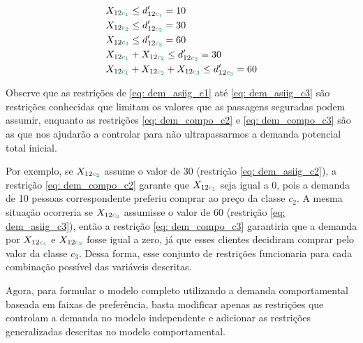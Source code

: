 \begin{align}
    & X_{12\textcolor[rgb]{0.0588, 0.5412, 0.4275}{c_1}} \leq d'_{12\textcolor[rgb]{0.0588, 0.5412, 0.4275}{c_1}} = 10                        \label{eq: dem_asiig_c1} \\
    & X_{12\textcolor[rgb]{0.0588, 0.5412, 0.4275}{c_2}} \leq d'_{12\textcolor[rgb]{0.0588, 0.5412, 0.4275}{c_2}} = 30                        \label{eq: dem_asiig_c2} \\
    & X_{12\textcolor[rgb]{0.0588, 0.5412, 0.4275}{c_3}} \leq d'_{12\textcolor[rgb]{0.0588, 0.5412, 0.4275}{c_3}} = 60                      \label{eq: dem_asiig_c3} \\
    & X_{12\textcolor[rgb]{0.0588, 0.5412, 0.4275}{c_1}} + X_{12\textcolor[rgb]{0.0588, 0.5412, 0.4275}{c_2}} \leq d'_{12\textcolor[rgb]{0.0588, 0.5412, 0.4275}{c_2}}  = 30           \label{eq: dem_compo_c2} \\
    & X_{12\textcolor[rgb]{0.0588, 0.5412, 0.4275}{c_1}} + X_{12\textcolor[rgb]{0.0588, 0.5412, 0.4275}{c_2}} + X_{12\textcolor[rgb]{0.0588, 0.5412, 0.4275}{c_3}} \leq d'_{12\textcolor[rgb]{0.0588, 0.5412, 0.4275}{c_3}} = 60 \label{eq: dem_compo_c3}                    
\end{align}

Observe que as restrições de \ref{eq: dem_asiig_c1} até \ref{eq: dem_asiig_c3} são restrições conhecidas que limitam os valores que as passagens seguradas podem assumir, enquanto as restrições \ref{eq: dem_compo_c2} e \ref{eq: dem_compo_c3} são as que nos ajudarão a controlar para não ultrapassarmos a demanda potencial total inicial. 

Por exemplo, se $X_{12\textcolor[rgb]{0.0588, 0.5412, 0.4275}{c_2}}$ assume o valor de 30 (restrição \ref{eq: dem_asiig_c2}), a restrição \ref{eq: dem_compo_c2} garante que $X_{12\textcolor[rgb]{0.0588, 0.5412, 0.4275}{c_1}}$ seja igual a 0, pois a demanda de 10 pessoas correspondente preferiu comprar ao preço da classe $c_2$. A mesma situação ocorreria se $X_{12\textcolor[rgb]{0.0588, 0.5412, 0.4275}{c_3}}$ assumisse o valor de 60 (restrição \ref{eq: dem_asiig_c3}), então a restrição \ref{eq: dem_compo_c3} garantiria que a demanda por $X_{12\textcolor[rgb]{0.0588, 0.5412, 0.4275}{c_1}}$ e $X_{12\textcolor[rgb]{0.0588, 0.5412, 0.4275}{c_2}}$ fosse igual a zero, já que esses clientes decidiram comprar pelo valor da classe $c_3$. Dessa forma, esse conjunto de restrições funcionaria para cada combinação possível das variáveis descritas.

Agora, para formular o modelo completo utilizando a demanda comportamental baseada em faixas de preferência, basta modificar apenas as restrições que controlam a demanda no modelo independente e adicionar as restrições generalizadas descritas no modelo comportamental.

